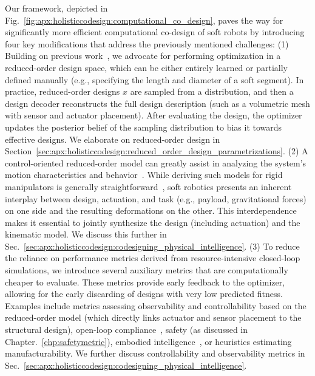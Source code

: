 Our framework, depicted in Fig.~\ref{fig:apx:holisticcodesign:computational_co_design}, paves the way for significantly more efficient computational co-design of soft robots by introducing four key modifications that address the previously mentioned challenges:
% 
(1) Building on previous work~\citep{spielberg2019learning, wang2024diffusebot}, we advocate for performing optimization in a reduced-order design space, which can be either entirely learned or partially defined manually (e.g., specifying the length and diameter of a soft segment). In practice, reduced-order designs $x$ are sampled from a distribution, and then a design decoder reconstructs the full design description (such as a volumetric mesh with sensor and actuator placement). After evaluating the design, the optimizer updates the posterior belief of the sampling distribution to bias it towards effective designs. We elaborate on reduced-order design in Section~\ref{sec:apx:holisticcodesign:reduced_order_design_parametrizations}.
% 
(2) A control-oriented reduced-order model can greatly assist in analyzing the system’s motion characteristics and behavior~\citep{bruder2020data, armanini2023soft, menager2023direct, alora2023data, stolzle2024input, alkayas2025soft, valadas2025learning}. While deriving such models for rigid manipulators is generally straightforward~\citep{siciliano2010robotics, zhao2020robogrammar}, soft robotics presents an inherent interplay between design, actuation, and task (e.g., payload, gravitational forces) on one side and the resulting deformations on the other. This interdependence makes it essential to jointly synthesize the design (including actuation) and the kinematic model. We discuss this further in Sec.~\ref{sec:apx:holisticcodesign:codesigning_physical_intelligence}.
% 
(3) To reduce the reliance on performance metrics derived from resource-intensive closed-loop simulations, we introduce several auxiliary metrics that are computationally cheaper to evaluate. These metrics provide early feedback to the optimizer, allowing for the early discarding of designs with very low predicted fitness. Examples include metrics assessing observability and controllability based on the reduced-order model (which directly links actuator and sensor placement to the structural design), open-loop compliance~\citep{guan2023trimmed}, safety (as discussed in Chapter.~\ref{chp:safetymetric}), embodied intelligence~\citep{cianchetti2021embodied, mengaldo2022concise, vihmar2023measure}, or heuristics estimating manufacturability. We further discuss controllability and observability metrics in Sec.~\ref{sec:apx:holisticcodesign:codesigning_physical_intelligence}.
